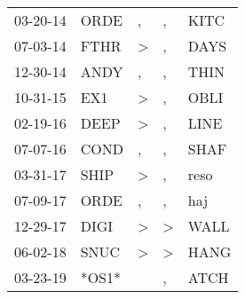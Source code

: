 \begin{supertabular}{lllll}
 03-20-14 &   ORDE &                , &                , &   KITC \\
 07-03-14 &   FTHR &     \textgreater &                , &   DAYS \\
 12-30-14 &   ANDY &                , &                , &   THIN \\
 10-31-15 &    EX1 &     \textgreater &                , &   OBLI \\
 02-19-16 &   DEEP &     \textgreater &                , &   LINE \\
 07-07-16 &   COND &                , &                , &   SHAF \\
 03-31-17 &   SHIP &     \textgreater &                , &   reso \\
 07-09-17 &   ORDE &                , &                , &    haj \\
 12-29-17 &   DIGI &     \textgreater &     \textgreater &   WALL \\
 06-02-18 &   SNUC &     \textgreater &     \textgreater &   HANG \\
 03-23-19 &  *OS1* &                  &                , &   ATCH \\
\end{supertabular}
